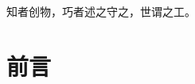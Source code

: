 \documentclass[14pt,a4paper,openany]{book}
\newcommand{\notebody}{
	\chapter*{前言}
	

	
	
	
	
	
	
	


}
\begin{document}
	

	\newpage

	\thispagestyle{empty}
	\vspace*{\fill}
	\begin{center}
		{\kaishu\fontsize{18}{28}\selectfont 知者创物，巧者述之守之，世谓之工。}
	\end{center}
	\vfill
	\newpage

	\pagestyle{mainstyle}

	\setcounter{tocdepth}{2}

	\tableofcontents

	\setcounter{page}{0}
	\thispagestyle{empty}
	\newpage
	\notebody
\end{document}
